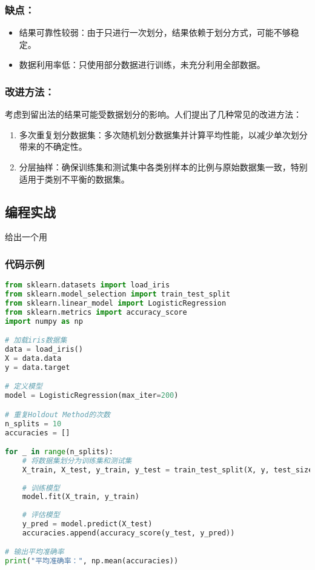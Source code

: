 \subsubsection{缺点：}
\begin{itemize}
\item 结果可靠性较弱：由于只进行一次划分，结果依赖于划分方式，可能不够稳定。
\item 数据利用率低：只使用部分数据进行训练，未充分利用全部数据。
\end{itemize}

\subsubsection{改进方法：}
考虑到留出法的结果可能受数据划分的影响。人们提出了几种常见的改进方法：

\begin{enumerate}
\item 多次重复划分数据集：多次随机划分数据集并计算平均性能，以减少单次划分带来的不确定性。
\item 分层抽样：确保训练集和测试集中各类别样本的比例与原始数据集一致，特别适用于类别不平衡的数据集。
\end{enumerate}

\subsection{编程实战}
给出一个用
\subsubsection{代码示例}
\begin{lstlisting}[language=python]
from sklearn.datasets import load_iris
from sklearn.model_selection import train_test_split
from sklearn.linear_model import LogisticRegression
from sklearn.metrics import accuracy_score
import numpy as np

# 加载iris数据集
data = load_iris()
X = data.data
y = data.target

# 定义模型
model = LogisticRegression(max_iter=200)

# 重复Holdout Method的次数
n_splits = 10
accuracies = []

for _ in range(n_splits):
    # 将数据集划分为训练集和测试集
    X_train, X_test, y_train, y_test = train_test_split(X, y, test_size=0.2)
    
    # 训练模型
    model.fit(X_train, y_train)
    
    # 评估模型
    y_pred = model.predict(X_test)
    accuracies.append(accuracy_score(y_test, y_pred))

# 输出平均准确率
print("平均准确率：", np.mean(accuracies))

\end{lstlisting}